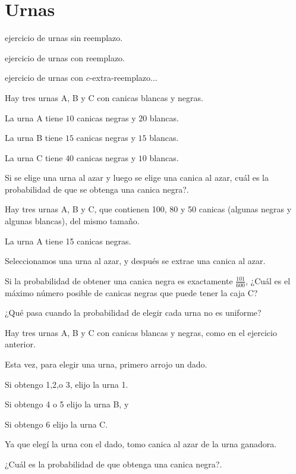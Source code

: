 \section{Urnas}

\begin{ejercicio}
ejercicio de urnas sin reemplazo.
\end{ejercicio}

\begin{ejercicio}
ejercicio de urnas con reemplazo.
\end{ejercicio}

\begin{ejercicio}
ejercicio de urnas con $c$-extra-reemplazo...
\end{ejercicio}

\begin{ejercicio}
Hay tres urnas A, B y C con canicas blancas y negras.

La urna A tiene $10$ canicas negras y $20$ blancas.

La urna B tiene $15$ canicas negras y $15$ blancas.

La urna C tiene $40$ canicas negras y $10$ blancas.

Si se elige una urna al azar y luego se elige una canica al azar, cuál es la probabilidad de que se obtenga una canica negra?.
\end{ejercicio}

\begin{ejercicio}
Hay tres urnas A, B y C, que contienen 100, 80 y 50 canicas (algunas negras y algunas blancas), del mismo tamaño.

La urna A tiene 15 canicas negras.

Seleccionamos una urna al azar, y después se extrae una canica al azar.

Si la probabilidad de obtener una canica negra es exactamente $\frac{101}{600}$, ¿Cuál es el máximo número posible de canicas negras que puede tener la caja C?
\end{ejercicio}

¿Qué pasa cuando la probabilidad de elegir cada urna no es uniforme?

\begin{ejercicio}

Hay tres urnas A, B y C con canicas blancas y negras, como en el ejercicio anterior.

Esta vez, para elegir una urna, primero arrojo un dado. 

Si obtengo 1,2,o 3, elijo la urna 1. 

Si obtengo 4 o 5 elijo la urna B, y 

Si obtengo 6 elijo la urna C. 

Ya que elegí la urna con el dado, tomo canica al azar de la urna ganadora.

¿Cuál es la probabilidad de que obtenga una canica negra?.
\end{ejercicio}

